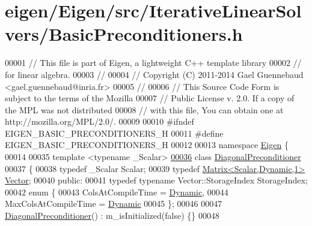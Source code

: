 \hypertarget{eigen_2_eigen_2src_2_iterative_linear_solvers_2_basic_preconditioners_8h_source}{}\section{eigen/\+Eigen/src/\+Iterative\+Linear\+Solvers/\+Basic\+Preconditioners.h}
\label{eigen_2_eigen_2src_2_iterative_linear_solvers_2_basic_preconditioners_8h_source}

\begin{DoxyCode}
00001 \textcolor{comment}{// This file is part of Eigen, a lightweight C++ template library}
00002 \textcolor{comment}{// for linear algebra.}
00003 \textcolor{comment}{//}
00004 \textcolor{comment}{// Copyright (C) 2011-2014 Gael Guennebaud <gael.guennebaud@inria.fr>}
00005 \textcolor{comment}{//}
00006 \textcolor{comment}{// This Source Code Form is subject to the terms of the Mozilla}
00007 \textcolor{comment}{// Public License v. 2.0. If a copy of the MPL was not distributed}
00008 \textcolor{comment}{// with this file, You can obtain one at http://mozilla.org/MPL/2.0/.}
00009 
00010 \textcolor{preprocessor}{#ifndef EIGEN\_BASIC\_PRECONDITIONERS\_H}
00011 \textcolor{preprocessor}{#define EIGEN\_BASIC\_PRECONDITIONERS\_H}
00012 
00013 \textcolor{keyword}{namespace }\hyperlink{namespace_eigen}{Eigen} \{ 
00014 
00035 \textcolor{keyword}{template} <\textcolor{keyword}{typename} \_Scalar>
\hyperlink{group___iterative_linear_solvers___module}{00036} \textcolor{keyword}{class }\hyperlink{group___iterative_linear_solvers___module_class_eigen_1_1_diagonal_preconditioner}{DiagonalPreconditioner}
00037 \{
00038     \textcolor{keyword}{typedef} \_Scalar Scalar;
00039     \textcolor{keyword}{typedef} \hyperlink{group___core___module}{Matrix<Scalar,Dynamic,1>} \hyperlink{group___core___module}{Vector};
00040   \textcolor{keyword}{public}:
00041     \textcolor{keyword}{typedef} \textcolor{keyword}{typename} Vector::StorageIndex StorageIndex;
00042     \textcolor{keyword}{enum} \{
00043       ColsAtCompileTime = \hyperlink{namespace_eigen_ad81fa7195215a0ce30017dfac309f0b2}{Dynamic},
00044       MaxColsAtCompileTime = \hyperlink{namespace_eigen_ad81fa7195215a0ce30017dfac309f0b2}{Dynamic}
00045     \};
00046 
00047     \hyperlink{group___iterative_linear_solvers___module_class_eigen_1_1_diagonal_preconditioner}{DiagonalPreconditioner}() : m\_isInitialized(\textcolor{keyword}{false}) \{\}
00048 

\end{DoxyCode}
